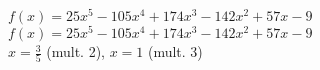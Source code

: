 {$f(x) = 25x^{5} - 105x^{4} + 174x^{3} - 142x^{2} + 57x - 9$}
{$f(x) = 25x^{5} - 105x^{4} + 174x^{3} - 142x^{2} + 57x - 9$ \\ $x = \frac{3}{5}$ (mult. 2), $x = 1$ (mult. 3)}